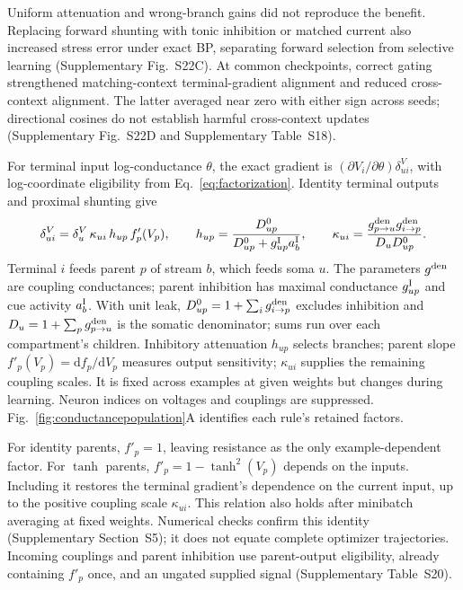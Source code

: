 \documentclass[11pt]{article}
\begin{document}
Uniform attenuation and wrong-branch gains did not reproduce the benefit. Replacing forward shunting with tonic inhibition or matched current also increased stress error under exact BP, separating forward selection from selective learning (Supplementary Fig.~S22C). At common checkpoints, correct gating strengthened matching-context terminal-gradient alignment and reduced cross-context alignment. The latter averaged near zero with either sign across seeds; directional cosines do not establish harmful cross-context updates (Supplementary Fig.~S22D and Supplementary Table~S18).

For terminal input log-conductance $\theta$, the exact gradient is $(\partial V_i/\partial\theta)\delta^V_{ui}$, with log-coordinate eligibility from Eq.~\ref{eq:factorization}. Identity terminal outputs and proximal shunting give
\begin{equation}
\delta^V_{ui}=\delta^V_u\,\kappa_{ui}\,h_{up}\,f'_p(V_p),\qquad
h_{up}=\frac{D_{up}^0}{D_{up}^0+g_{up}^{\rm I}a_b^{\rm I}},\qquad
\kappa_{ui}=\frac{g_{p\to u}^{\rm den}g_{i\to p}^{\rm den}}{D_uD_{up}^0}.
\label{eq:populationtransport}
\end{equation}
Terminal $i$ feeds parent $p$ of stream $b$, which feeds soma $u$. The parameters $g^{\rm den}$ are coupling conductances; parent inhibition has maximal conductance $g_{up}^{\rm I}$ and cue activity $a_b^{\rm I}$. With unit leak, $D_{up}^0=1+\sum_i g_{i\to p}^{\rm den}$ excludes inhibition and $D_u=1+\sum_p g_{p\to u}^{\rm den}$ is the somatic denominator; sums run over each compartment's children. Inhibitory attenuation $h_{up}$ selects branches; parent slope $f'_p(V_p)=\mathrm d f_p/\mathrm d V_p$ measures output sensitivity; $\kappa_{ui}$ supplies the remaining coupling scales. It is fixed across examples at given weights but changes during learning. Neuron indices on voltages and couplings are suppressed. Fig.~\ref{fig:conductancepopulation}A identifies each rule's retained factors.

For identity parents, $f'_p=1$, leaving resistance as the only example-dependent factor. For $\tanh$ parents, $f'_p=1-\tanh^2(V_p)$ depends on the inputs. Including it restores the terminal gradient's dependence on the current input, up to the positive coupling scale $\kappa_{ui}$. This relation also holds after minibatch averaging at fixed weights. Numerical checks confirm this identity (Supplementary Section~S5); it does not equate complete optimizer trajectories. Incoming couplings and parent inhibition use parent-output eligibility, already containing $f'_p$ once, and an ungated supplied signal (Supplementary Table~S20).
\end{document}
